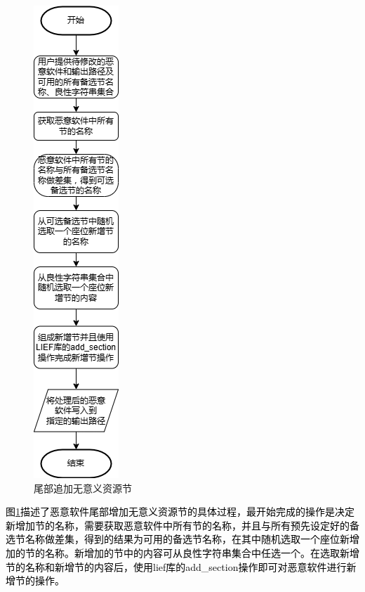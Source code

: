 \begin{figure}
  \centering
  \includegraphics[scale=0.8]{images/append_benign_sections.png}
  \caption{尾部追加无意义资源节}\label{fig:append_benign_sections}
\end{figure}
\textcolor{black}{图\ref{fig:append_benign_sections}描述了恶意软件尾部增加无意义资源节的具体过程，最开始完成的操作是决定新增加节的名称，需要获取恶意软件中所有节的名称，并且与所有预先设定好的备选节名称做差集，得到的结果为可用的备选节名称，在其中随机选取一个座位新增加的节的名称。新增加的节中的内容可从良性字符串集合中任选一个。在选取新增节的名称和新增节的内容后，使用lief库的add\_section操作即可对恶意软件进行新增节的操作。}

